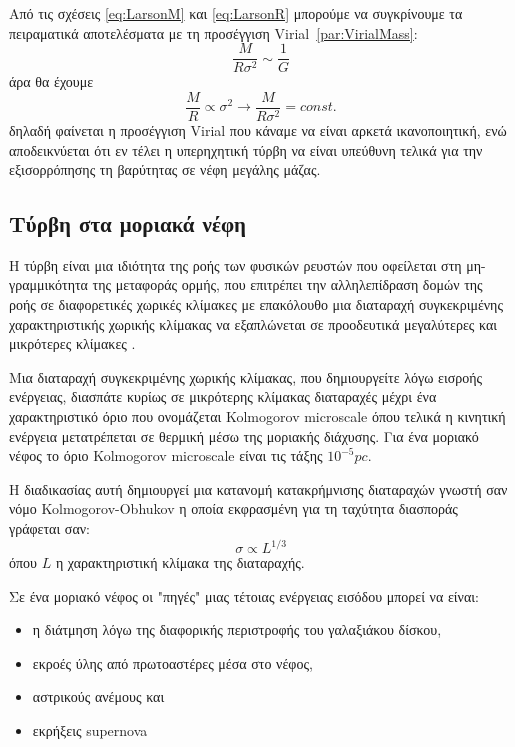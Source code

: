 \documentclass[a4paper,12pt]{memoir}
\begin{document}
Από τις σχέσεις \ref{eq:LarsonM} και \ref{eq:LarsonR} μπορούμε να συγκρίνουμε τα πειραματικά αποτελέσματα με τη προσέγγιση Virial~\ref{par:VirialMass}: 
$$
\frac{M}{R \sigma ^2}\sim \frac{1}{G}
$$
άρα θα έχουμε
\begin{equation}
\frac{M}{R}\propto \sigma ^2 \rightarrow \frac{M}{R \sigma ^2}=const.
\end{equation}
δηλαδή φαίνεται η προσέγγιση Virial που κάναμε να είναι αρκετά ικανοποιητική, ενώ αποδεικνύεται ότι εν τέλει η υπερηχητική τύρβη να είναι υπεύθυνη τελικά για την εξισορρόπησης τη βαρύτητας σε νέφη μεγάλης μάζας. 

\subsection{Τύρβη στα μοριακά νέφη}
Η τύρβη είναι μια ιδιότητα της ροής των φυσικών ρευστών που οφείλεται στη μη-γραμμικότητα της μεταφοράς ορμής, που επιτρέπει την αλληλεπίδραση δομών της ροής σε διαφορετικές χωρικές κλίμακες με επακόλουθο μια διαταραχή συγκεκριμένης χαρακτηριστικής χωρικής κλίμακας να εξαπλώνεται σε προοδευτικά μεγαλύτερες και μικρότερες κλίμακες \cite{sofianos_turbulence}.

Μια διαταραχή συγκεκριμένης χωρικής κλίμακας, που δημιουργείτε λόγω εισροής ενέργειας, διασπάτε κυρίως σε μικρότερης κλίμακας διαταραχές μέχρι ένα χαρακτηριστικό όριο που ονομάζεται Kolmogorov microscale όπου τελικά η κινητική ενέργεια μετατρέπεται σε θερμική μέσω της μοριακής διάχυσης. Για ένα μοριακό νέφος το όριο Kolmogorov microscale είναι τις τάξης $10^{-5} pc$.

Η διαδικασίας αυτή δημιουργεί μια κατανομή κατακρήμνισης διαταραχών γνωστή σαν νόμο Kolmogorov-Obhukov η οποία εκφρασμένη για τη ταχύτητα διασποράς γράφεται σαν:
\begin{equation}
\sigma \propto L^{1/3}
\end{equation} 
όπου $L$ η χαρακτηριστική κλίμακα της διαταραχής.

Σε ένα μοριακό νέφος οι "πηγές" μιας τέτοιας ενέργειας εισόδου μπορεί να είναι:
\begin{itemize}
	\item η διάτμηση λόγω της διαφορικής περιστροφής του γαλαξιάκου δίσκου,
	\item εκροές ύλης από πρωτοαστέρες μέσα στο νέφος,
	\item αστρικούς ανέμους και
	\item εκρήξεις supernova
\end{itemize}
\end{document}
